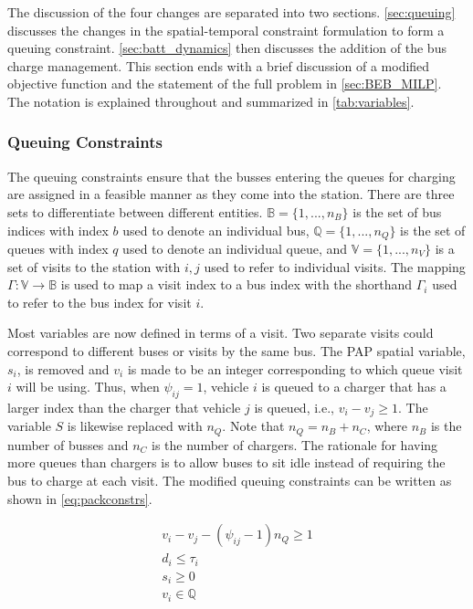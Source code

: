 \documentclass[11pt,a4paper,final]{article}
\begin{document}
The discussion of the four changes are separated into two sections. \autoref{sec:queuing} discusses the changes in the
spatial-temporal constraint formulation to form a queuing constraint. \autoref{sec:batt_dynamics} then discusses the
addition of the bus charge management. This section ends with a brief discussion of a modified objective function and
the statement of the full problem in \autoref{sec:BEB_MILP}. The notation is explained throughout and summarized in
\autoref{tab:variables}.

\subsubsection{Queuing Constraints}
\label{sec:queuing}
\noindent
The queuing constraints ensure that the busses entering the queues for charging are assigned in a feasible manner as
they come into the station. There are three sets to differentiate between different entities. \(\mathbb{B} = \{1, ...,
n_B\}\) is the set of bus indices with index \(b\) used to denote an individual bus, \(\mathbb{Q} = \{1, ..., n_Q\}\) is the set of
queues with index \(q\) used to denote an individual queue, and \(\mathbb{V} = \{1, ..., n_V\}\) is a set of visits to the
station with \(i,j\) used to refer to individual visits. The mapping \(\Gamma: \mathbb{V} \rightarrow \mathbb{B}\) is used to map a visit
index to a bus index with the shorthand \(\Gamma_i\) used to refer to the bus index for visit \(i\).

Most variables are now defined in terms of a visit. Two separate visits could correspond to different buses or visits by
the same bus. The PAP spatial variable, \(s_i\), is removed and \(v_i\) is made to be an integer corresponding to which
queue visit \(i\) will be using. Thus, when \(\psi_{ij} = 1\), vehicle \(i\) is queued to a charger that has a larger index than
the charger that vehicle \(j\) is queued, i.e., \(v_i-v_j \geq 1\). The variable \(S\) is likewise replaced with \(n_Q\). Note that
\(n_Q = n_B + n_C\), where \(n_B\) is the number of busses and \(n_C\) is the number of chargers. The rationale for having
more queues than chargers is to allow buses to sit idle instead of requiring the bus to charge at each visit. The
modified queuing constraints can be written as shown in \autoref{eq:packconstrs}.

\begin{subequations}
\label{eq:packconstrs}
\begin{align}
    v_i - v_j - (\psi_{ij} - 1)n_Q \geq 1       \label{subeq:space}        \\
    d_i \leq \tau_i                             \label{subeq:valid_depart} \\
    s_i \geq 0                               \label{subeq:pos_charge} \\
    v_i \in \mathbb{Q}                       \label{subeq:vspace}
\end{align}
\end{subequations}
\end{document}
